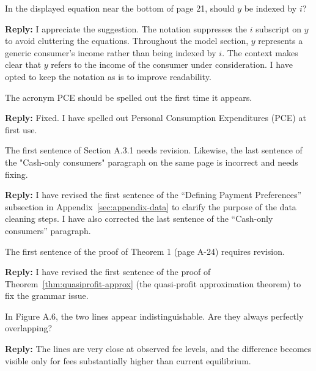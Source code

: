 \documentclass[main.tex]{subfiles}
\begin{document}
\begin{refsection}
\begin{refcommentnoclear}
In the displayed equation near the bottom of page 21, should $y$ be indexed by $i$?

\end{refcommentnoclear}

\textbf{Reply:} I appreciate the suggestion.
The notation suppresses the $i$ subscript on $y$ to avoid cluttering the equations.
Throughout the model section, $y$ represents a generic consumer's income rather than being indexed by $i$.
The context makes clear that $y$ refers to the income of the consumer under consideration.
I have opted to keep the notation as is to improve readability.

\begin{refcommentnoclear}
The acronym PCE should be spelled out the first time it appears.

\end{refcommentnoclear}

\textbf{Reply:} Fixed.
I have spelled out Personal Consumption Expenditures (PCE) at first use.

\begin{refcommentnoclear}
The first sentence of Section A.3.1 needs revision.
Likewise, the last sentence of the "Cash-only consumers" paragraph on the same page is incorrect and needs fixing.

\end{refcommentnoclear}

\textbf{Reply:} I have revised the first sentence of the ``Defining Payment Preferences'' subsection in Appendix~\ref{sec:appendix-data} to clarify the purpose of the data cleaning steps.
I have also corrected the last sentence of the ``Cash-only consumers'' paragraph.

\begin{refcommentnoclear}
The first sentence of the proof of Theorem 1 (page A-24) requires revision.

\end{refcommentnoclear}

\textbf{Reply:} I have revised the first sentence of the proof of Theorem~\ref{thm:quasiprofit-approx} (the quasi-profit approximation theorem) to fix the grammar issue.

\begin{refcommentnoclear}
In Figure A.6, the two lines appear indistinguishable.
Are they always perfectly overlapping?
\end{refcommentnoclear}

\textbf{Reply:} The lines are very close at observed fee levels, and the difference becomes visible only for fees substantially higher than current equilibrium.


\end{refsection}
\end{document}

